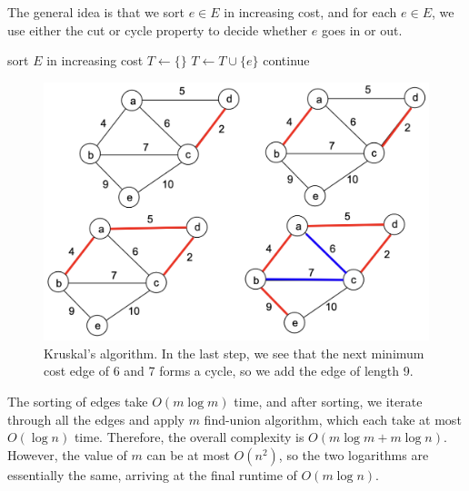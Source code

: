 \documentclass{article}
\begin{document}
      \begin{algo}
        The general idea is that we sort $e \in E$ in increasing cost, and for each $e \in E$, we use either the cut or cycle property to decide whether $e$ goes in or out. 

        \begin{algorithm}[H]
          \label{alg:prim_kruskal}
          \begin{algorithmic}[1]
              \State sort $E$ in increasing cost 
              \State $T \gets \{\}$
                  \State $T \gets T \cup \{e\}$ 
                \Else {} 
                  \State continue 
                \EndIf
              \EndFor
            \EndFunction
          \end{algorithmic}
        \end{algorithm}

        \begin{figure}[H]
          \centering 
          \includegraphics[scale=0.4]{img/kruskal.png}
          \caption{Kruskal's algorithm. In the last step, we see that the next minimum cost edge of 6 and 7 forms a cycle, so we add the edge of length 9.} 
          \label{fig:kruskal}
        \end{figure}
        The sorting of edges take $O(m \log{m})$ time, and after sorting, we iterate through all the edges and apply $m$ find-union algorithm, which each take at most $O(\log{n})$ time. Therefore, the overall complexity is $O(m \log{m} + m \log{n})$. However, the value of $m$ can be at most $O(n^2)$, so the two logarithms are essentially the same, arriving at the final runtime of $O(m \log{n})$. 
      \end{algo}
\end{document}
